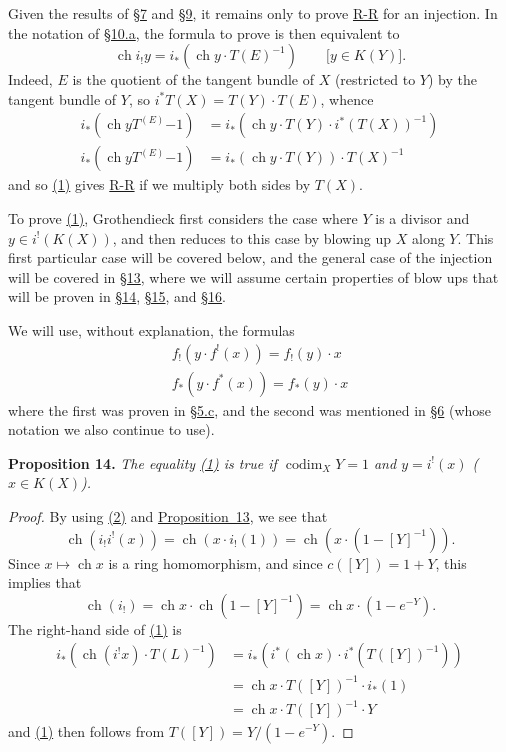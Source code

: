 \documentclass{article}
\newenvironment{itenv}[1]
  {\phantomsection\par\medskip\noindent\textbf{#1.}\itshape}
  {\medskip}
\DeclareMathOperator{\ch}{ch}
\DeclareMathOperator{\codim}{codim}
\newcommand{\oldpage}[1]{\marginpar{\footnotesize$\Big\vert$ \textit{p.~#1}}}
\begin{document}
Given the results of \hyperref[section7]{\S7} and \hyperref[section9]{\S9}, it remains only to prove \hyperref[theoremriemannroch]{R-R} for an injection.
In the notation of \hyperref[subsection10a]{\S10.a}, the formula to prove is then equivalent to
\[
\label{section11equation1}
  \ch i_!y = i_*(\ch y\cdot T(E)^{-1})
  \qquad\mbox{[$y\in K(Y)$].}
  \tag{1}
\]
Indeed, $E$ is the quotient of the tangent bundle of $X$ (restricted to $Y$) by the tangent bundle of $Y$, so $i^*T(X) = T(Y)\cdot T(E)$, whence
\begin{align*}
  i_*(\ch y T^(E){-1}) &= i_*(\ch y\cdot T(Y)\cdot i^*(T(X))^{-1})
\\i_*(\ch y T^(E){-1}) &= i_*(\ch y\cdot T(Y))\cdot T(X)^{-1}
\end{align*}
and so \hyperref[section11equation1]{(1)} gives \hyperref[theoremriemannroch]{R-R} if we multiply both sides by $T(X)$.

To prove \hyperref[section11equation1]{(1)}, Grothendieck first considers the case where $Y$ is a divisor and $y\in i^!(K(X))$, and then reduces to this case by blowing up $X$ along $Y$.
This first particular case will be covered below, and the general case of the injection will be covered in \hyperref[section13]{\S13}, where we will assume certain properties of blow ups that will be proven in \hyperref[section14]{\S14}, \hyperref[section15]{\S15}, and \hyperref[section16]{\S16}.

We will use, without explanation, the formulas
\[
\label{section11equation2}
  \begin{aligned}
    f_!(y\cdot f^!(x)) = f_!(y)\cdot x
  \\f_*(y\cdot f^*(x)) = f_*(y)\cdot x
  \end{aligned}
  \tag{2}
\]
where the first was proven in \hyperref[subsection5c]{\S5.c}, and the second was mentioned in \hyperref[section6]{\S6} (whose notation we also continue to use).

\begin{itenv}{Proposition 14}
\label{proposition14}
  The equality \hyperref[section11equation1]{(1)} is true if $\codim_XY=1$ and $y=i^!(x)$ ($x\in K(X)$).
\end{itenv}

\begin{proof}
  By using \hyperref[section11equation2]{(2)} and \hyperref[proposition13]{Proposition~13}, we see that
  \[
    \ch(i_!i^!(x)) = \ch(x\cdot i_!(1)) = \ch(x\cdot(1-[Y]^{-1})).
  \]
  Since $x\mapsto\ch x$ is a ring homomorphism, and since $c([Y])=1+Y$,
\oldpage{125}
  this implies that
  \[
    \ch(i_!) = \ch x\cdot\ch(1-[Y]^{-1}) = \ch x\cdot(1-e^{-Y}).
  \]
  The right-hand side of \hyperref[section11equation1]{(1)} is
  \begin{align*}
    i_*(\ch(i^!x)\cdot T(L)^{-1})
    &= i_*(i^*(\ch x)\cdot i^*(T([Y])^{-1}))
  \\&= \ch x\cdot T([Y])^{-1}\cdot i_*(1)
  \\&= \ch x\cdot T([Y])^{-1}\cdot Y
  \end{align*}
  and \hyperref[section11equation1]{(1)} then follows from $T([Y])=Y/(1-e^{-Y})$.
\end{proof}
\end{document}
